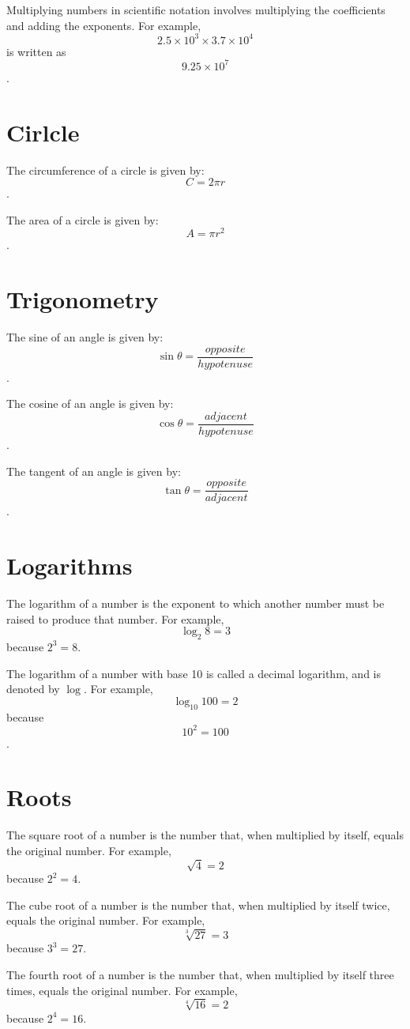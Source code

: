 \documentclass{article}
\begin{document}
Multiplying numbers in scientific notation involves multiplying the coefficients and adding the exponents. For example, $$2.5 \times 10^3 \times 3.7 \times 10^4$$ is written as $$9.25 \times 10^7$$.

\section{Cirlcle}
The circumference of a circle is given by: $$C = 2 \pi r$$.

The area of a circle is given by: $$A = \pi r^2$$.

\section{Trigonometry}

The sine of an angle is given by: $$\sin \theta = \frac{opposite}{hypotenuse}$$.

The cosine of an angle is given by: $$\cos \theta = \frac{adjacent}{hypotenuse}$$.

The tangent of an angle is given by: $$\tan \theta = \frac{opposite}{adjacent}$$.

\section{Logarithms}

The logarithm of a number is the exponent to which another number must be raised to produce that number. For example, $$\log_2 8 = 3$$ because $2^3 = 8$.

The logarithm of a number with base 10 is called a decimal logarithm, and is denoted by $\log$. For example, $$\log_{10} 100 = 2$$ because $$10^2 = 100$$.

\section{Roots}

The square root of a number is the number that, when multiplied by itself, equals the original number. For example, $$\sqrt{4} = 2$$ because $2^2 = 4$.

The cube root of a number is the number that, when multiplied by itself twice, equals the original number. For example, $$\sqrt[3]{27} = 3$$ because $3^3 = 27$.

The fourth root of a number is the number that, when multiplied by itself three times, equals the original number. For example, $$\sqrt[4]{16} = 2$$ because $2^4 = 16$.
\end{document}
